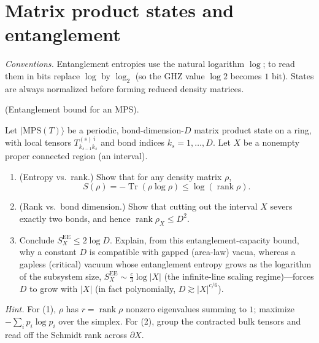 \documentclass[11pt,a4paper]{article}
\newcounter{problem}
\begin{document}
	\section{Matrix product states and entanglement}
	\textit{Conventions.} Entanglement entropies use the natural logarithm $\log$; to read them in bits replace $\log$ by $\log_2$ (so the GHZ value $\log 2$ becomes $1$ bit). States are always normalized before forming reduced density matrices.
	\begin{problembox}[3]
		\label{prob.3}
		(Entanglement bound for an MPS).
		
		Let $\lvert\mathrm{MPS}(T)\rangle$ be a periodic, bond-dimension-$D$
		matrix product state on a ring, with local tensors
		$T_{k_{s-1}k_s}^{(s)\,i}$ and bond indices
		$k_s=1,\ldots,D$. Let $X$ be a nonempty proper connected region
		(an interval).
		
		\begin{enumerate}
			\item
			(Entropy vs.\ rank.) Show that for any density matrix $\rho$,
			\[
			S(\rho)
			=
			-\operatorname{Tr}(\rho\log\rho)
			\leq
			\log(\operatorname{rank}\rho).
			\]
			
			\item
			(Rank vs.\ bond dimension.) Show that cutting out the interval
			$X$ severs exactly two bonds, and hence
			$\operatorname{rank}\rho_X\leq D^2$.
			
			\item
			Conclude $S_X^{\mathrm{EE}}\leq 2\log D$. Explain, from this
			entanglement-capacity bound, why a constant $D$ is compatible
			with gapped (area-law) vacua, whereas a gapless (critical) vacuum
			whose entanglement entropy grows as the logarithm of the subsystem
			size, $S_X^{\mathrm{EE}}\sim \frac{c}{3}\log\lvert X\rvert$
			(the infinite-line scaling regime)---forces $D$ to grow with
			$\lvert X\rvert$ (in fact polynomially,
			$D\gtrsim \lvert X\rvert^{c/6}$).
		\end{enumerate}
		
		\textit{Hint.}
		For (1), $\rho$ has $r=\operatorname{rank}\rho$ nonzero eigenvalues
		summing to $1$; maximize $-\sum_i p_i\log p_i$ over the simplex.
		For (2), group the contracted bulk tensors and read off the Schmidt
		rank across $\partial X$.
	\end{problembox}
\end{document}
